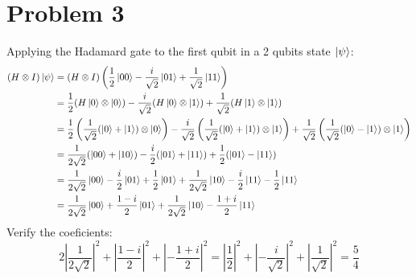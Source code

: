 \documentclass[12pt]{article}
\begin{document}
\section*{Problem 3}
Applying the Hadamard gate to the first qubit in a 2 qubits state \(\ket{\psi}\):
\begin{align*}
	(H \otimes I)\ket{\psi} & = (H \otimes I) \left(\frac{1}{2}\ket{00} - \frac{i}{\sqrt{2}} \ket{01} + \frac{1}{\sqrt{2}}\ket{11}\right)                                                                                                                                                      \\
	                        & = \frac{1}{2} (H\ket{0} \otimes \ket{0}) - \frac{i}{\sqrt{2}} (H\ket{0} \otimes \ket{1}) + \frac{1}{\sqrt{2}} (H\ket{1} \otimes \ket{1})                                                                                                                         \\
	                        & = \frac{1}{2} \left(\frac{1}{\sqrt{2}}(\ket{0} + \ket{1}) \otimes \ket{0}\right) - \frac{i}{\sqrt{2}} \left(\frac{1}{\sqrt{2}}(\ket{0} + \ket{1}) \otimes \ket{1}\right) + \frac{1}{\sqrt{2}} \left(\frac{1}{\sqrt{2}}(\ket{0} - \ket{1}) \otimes \ket{1}\right) \\
	                        & = \frac{1}{2\sqrt{2}}(\ket{00} + \ket{10}) - \frac{i}{2}(\ket{01} + \ket{11}) + \frac{1}{2}(\ket{01} - \ket{11})                                                                                                                                                 \\
	                        & = \frac{1}{2 \sqrt{2}}\ket{00} - \frac{i}{2} \ket{01} + \frac{1}{2} \ket{01} + \frac{1}{2 \sqrt{2}}\ket{10} - \frac{i}{2} \ket{11} - \frac{1}{2} \ket{11}                                                                                                        \\
	                        & = \frac{1}{2 \sqrt{2}}\ket{00} + \frac{1-i}{2} \ket{01} + \frac{1}{2 \sqrt{2}}\ket{10} - \frac{1+i}{2} \ket{11}
\end{align*}
Verify the coeficients:
\[2\left|\frac{1}{2\sqrt{2}}\right|^2 + \left|\frac{1-i}{2}\right|^2 + \left|-\frac{1+i}{2}\right|^2 = \left|\frac{1}{2}\right|^2 + \left|-\frac{i}{\sqrt{2}}\right|^2 + \left|\frac{1}{\sqrt{2}}\right|^2 = \frac{5}{4}\]
\end{document}
